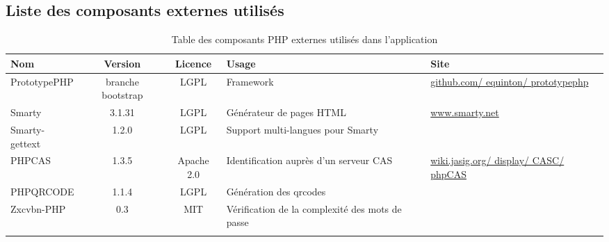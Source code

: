 \subsection{Liste des composants externes utilisés}

\begin{longtable}{|>{\raggedright\arraybackslash}p{3cm}|c|c|>{\raggedright\arraybackslash}p{3cm}|>{\raggedright\arraybackslash}p{3cm}|}
\hline 
\textbf{Nom} & \textbf{Version} & \textbf{Licence} & \textbf{Usage} & \textbf{Site} \\ 
\hline 
\endhead
PrototypePHP & branche bootstrap & LGPL & Framework & \href{https://github.com/equinton/prototypephp}{github.com/ equinton/ prototypephp} \\ 
Smarty & 3.1.31 & LGPL & Générateur de pages HTML & \href{http://www.smarty.net}{www.smarty.net} \\ 
Smarty-gettext & 1.2.0 & LGPL & Support multi-langues pour Smarty & \\
PHPCAS & 1.3.5 & Apache 2.0 & Identification auprès d'un serveur CAS & \href{https://wiki.jasig.org/display/CASC/phpCAS}{wiki.jasig.org/ display/ CASC/ phpCAS} \\ 
PHPQRCODE &  1.1.4 & LGPL & Génération des qrcodes & \\
Zxcvbn-PHP & 0.3 & MIT & Vérification de la complexité des mots de passe & \\

\hline 
\caption{Table des composants PHP externes utilisés dans l'application}
\end{longtable} 

